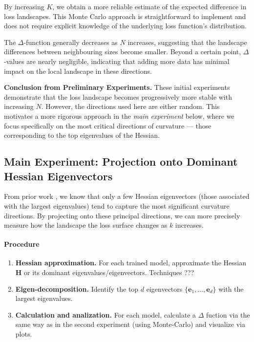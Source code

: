 \documentclass{article}
\begin{document}
By increasing $K$, we obtain a more reliable estimate of the expected difference in loss landscapes.
This Monte Carlo approach is straightforward to implement and does not require explicit knowledge of the underlying loss
function's distribution.

The $\Delta$-function generally decreases as $N$ increases, suggesting that the landscape differences between neighbouring
sizes become smaller.
Beyond a certain point, $\Delta$-values are nearly negligible, indicating that adding more data has minimal impact on
the local landscape in these directions.


\noindent
\textbf{Conclusion from Preliminary Experiments.}
These initial experiments demonstrate that the loss landscape becomes progressively more stable with increasing $N$.
However, the directions used here are either random. This motivates a more rigorous approach in the \emph{main experiment}
below, where we focus specifically on the most critical directions of curvature --- those corresponding to the top
eigenvalues of the Hessian.

\subsection{Main Experiment: Projection onto Dominant Hessian Eigenvectors}

From prior work \cite{sagun2018empirical}, we know that only a few Hessian eigenvectors (those associated with the largest
eigenvalues) tend to capture the most significant curvature directions. By projecting onto these principal directions,
we can more precisely measure how the landscape the loss surface changes as $k$ increases.

\paragraph{Procedure}
\begin{enumerate}
  \item \textbf{Hessian approximation.} For each trained model, approximate
        the Hessian $\mathbf{H}$ or its dominant eigenvalues/eigenvectors. Techniques ???
  \item \textbf{Eigen-decomposition.} Identify the top $d$ eigenvectors $\{\mathbf{e}_1, \dots, \mathbf{e}_d\}$ with the
        largest eigenvalues.
  \item \textbf{Calculation and analization.} For each model, calculate a $\Delta$ fuction via the same way as in the second
        experiment (using Monte-Carlo) and visualize via plots.
\end{enumerate}
\end{document}
